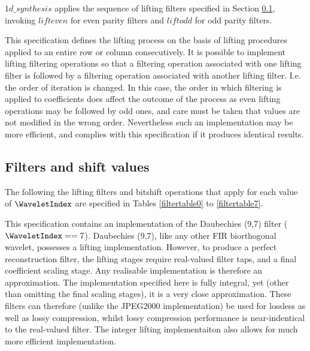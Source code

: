 $1d\_synthesis$ applies the sequence of lifting filters specified in Section \ref{wltfilters},
invoking $lifteven$ for even parity filters and $liftodd$ for odd parity filters.

\begin{informative}
This specification defines the lifting process on the basis of lifting
procedures applied to an entire row or column consecutively. It is
possible to implement lifting filtering operations so that a filtering
operation associated with one lifting filter is followed by a filtering
operation associated with another lifting filter. I.e. the order of
iteration is changed. In this case, the order in which filtering is
applied to coefficients does affect the outcome of the process as even
lifting operations may be followed by odd ones, and care must be taken
that values are not modified in the wrong order. Nevertheless such an
implementation may be more efficient, and complies with this
specification if it produces identical results.
\end{informative}

\subsection{Filters and shift values}
\label{wltfilters}

The following the lifting filters and bitshift operations that
apply for each value of $\WaveletIndex$ are specified in Tables \ref{filtertable0} to
\ref{filtertable7}.

\begin{informative}
This specification contains an implementation of the Daubechies (9,7) filter 
($\WaveletIndex==7$). Daubechies (9,7), like any other FIR biorthogonal wavelet, possesses a lifting
implementation. However, to produce a perfect reconstruction filter, the lifting stages 
require real-valued filter taps, and a final coefficient scaling stage. Any realisable implementation
is therefore an approximation. The implementation specified here is fully integral, yet (other than omitting
the final scaling stages), it is a very close approximation. These filters can therefore
(unlike the JPEG2000 implementation) be used for lossless as well as lossy compression, whilst lossy
compression performance is near-indentical to the real-valued filter. The integer lifting implementaiton
also allows for much more efficient implementation.
\end{informative}


